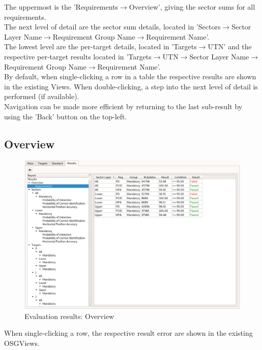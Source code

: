 The uppermost is the 'Requirements$\rightarrow$Overview', giving the sector sums for all requirements. \\

The next level of detail are the sector sum details, located in 'Sectors$\rightarrow$Sector Layer Name$\rightarrow$Requirement Group Name$\rightarrow$Requirement Name'. \\

The lowest level are the per-target details, located in 'Targets$\rightarrow$UTN' and the respective per-target results located in 'Targets$\rightarrow$UTN$\rightarrow$Sector Layer Name$\rightarrow$Requirement Group Name$\rightarrow$Requirement Name'. \\

By default, when single-clicking a row in a table the respective results are shown in the existing Views. When double-clicking, a step into the next level of detail is performed (if available). \\

Navigation can be made more efficient by returning to the last sub-result by using the 'Back' button on the top-left.

\subsection{Overview}
\begin{figure}[H]
  \hspace*{-2cm}
    \includegraphics[width=18cm,frame]{../screenshots/eval_results_overview.png}
  \caption{Evaluation results: Overview}
\end{figure}

When single-clicking a row, the respective result error are shown in the existing OSGViews.


